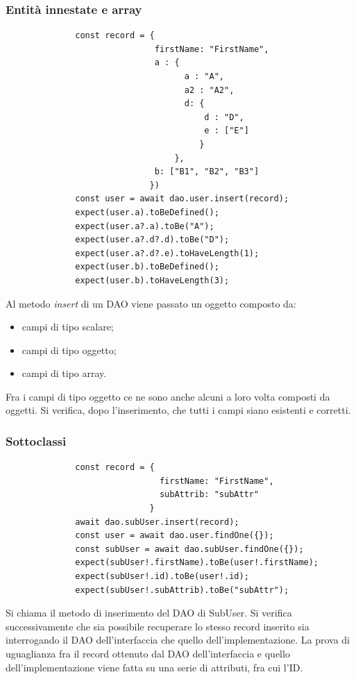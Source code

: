\documentclass[a4paper, 12pt]{report}
\begin{document}
          \subsubsection{Entità innestate e array}
            \begin{Verbatim}
              const record = {
                              firstName: "FirstName",
                              a : { 
                                    a : "A",
                                    a2 : "A2",
                                    d: { 
                                        d : "D",
                                        e : ["E"]
                                       }
                                  },
                              b: ["B1", "B2", "B3"]
                             })
              const user = await dao.user.insert(record);
              expect(user.a).toBeDefined();
              expect(user.a?.a).toBe("A");
              expect(user.a?.d?.d).toBe("D");
              expect(user.a?.d?.e).toHaveLength(1);
              expect(user.b).toBeDefined();
              expect(user.b).toHaveLength(3);
            \end{Verbatim}
            Al metodo \emph{insert} di un DAO viene passato un oggetto composto da:
            \begin{itemize}
              \item campi di tipo scalare;
              \item campi di tipo oggetto;
              \item campi di tipo array.
            \end{itemize}
            Fra i campi di tipo oggetto ce ne sono anche alcuni a loro volta composti da oggetti.
            Si verifica, dopo l'inserimento, che tutti i campi siano esistenti e corretti.
          \subsubsection{Sottoclassi}
            \begin{Verbatim}
              const record = { 
                               firstName: "FirstName",
                               subAttrib: "subAttr"
                             }
              await dao.subUser.insert(record);
              const user = await dao.user.findOne({});
              const subUser = await dao.subUser.findOne({});
              expect(subUser!.firstName).toBe(user!.firstName);
              expect(subUser!.id).toBe(user!.id);
              expect(subUser!.subAttrib).toBe("subAttr");
            \end{Verbatim}
            Si chiama il metodo di inserimento del DAO di SubUser. Si verifica successivamente che sia possibile recuperare lo stesso record inserito sia interrogando il DAO dell'interfaccia che quello dell'implementazione. La prova di uguaglianza fra il record ottenuto dal DAO
            dell'interfaccia e quello dell'implementazione viene fatta su una serie di attributi, fra cui l'ID.
\end{document}
